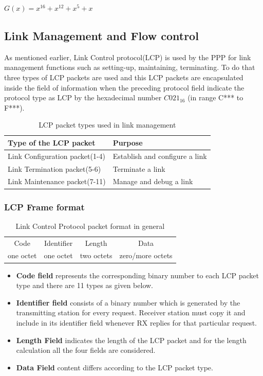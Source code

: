 \documentclass[a4paper,11pt]{article}%
\begin{document}
$G(x) = x^{16}+x^{12}+x^{5}+x$

\subsection{Link Management and Flow control}

As mentioned earlier, Link Control protocol(LCP) is used by the PPP for link management functions such as setting-up,  maintaining, terminating. To do that three types of LCP packets are used and this LCP packets are encapsulated inside the field of information when the preceding protocol field indicate the protocol type as LCP by the hexadecimal number ${C021}_{16}$ (in range C*** to F***). \\

\begin{table}[!h]
	\centering
	\begin{tabular}{l |l}
		\textbf{Type of the LCP packet} &\textbf{Purpose}\\\hline
		Link Configuration packet(1-4)&Establish and configure a link\\
		Link Termination packet(5-6)&Terminate a link\\
		Link Maintenance packet(7-11)&Manage and debug a link\\\hline\hline
	\end{tabular}
\caption{LCP packet types used in link management\cite{ppp} }
\end{table} 


\subsubsection{LCP Frame format}
\begin{table}[!h]
	\centering
	\begin{tabular}{|c |c| c|c|}\hline
		Code &Identifier& Length&Data\\
		one octet&one octet& two octets&zero/more octets\\\hline
	\end{tabular}
	\caption{ Link Control Protocol packet format in general\cite{ppp}}
\end{table}

\begin{itemize}
	\item \textbf{Code field} represents the corresponding binary number to each LCP packet type and there are 11 types as given below.
	\item \textbf{Identifier field} consists of a binary number which is generated by the transmitting station for every request. Receiver station must copy it and include in its identifier field whenever RX replies for that particular request.
	\item \textbf{Length Field} indicates the length of the LCP packet and for the length calculation all the four fields are considered.
	
	\item \textbf{Data Field} content differs according to the LCP packet type.
\end{itemize}
\end{document}
